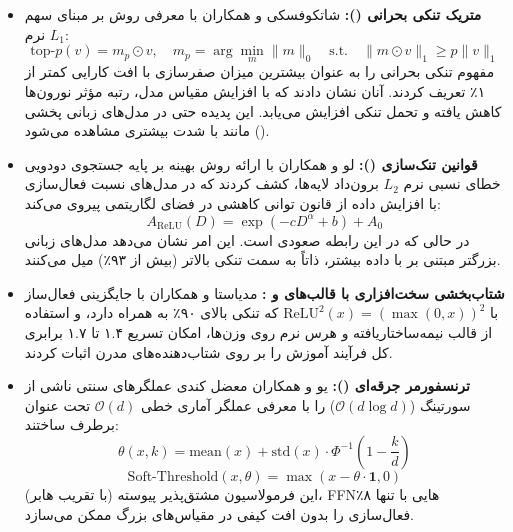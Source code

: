 \begin{itemize}
    \item \textbf{متریک تنکی بحرانی ():} شاتکوفسکی و همکاران \cite{szatkowski2026universal} با معرفی روش  بر مبنای سهم نرم $L_1$:
    \begin{equation}
        \text{top-}p(v) = m_p \odot v, \quad m_p = \arg\min_m \|m\|_0 \quad \text{s.t.} \quad \|m \odot v\|_1 \ge p \|v\|_1
    \end{equation}
    مفهوم تنکی بحرانی را به عنوان بیشترین میزان صفرسازی با افت کارایی کمتر از ۱٪ تعریف کردند. آنان نشان دادند که با افزایش مقیاس مدل، رتبه مؤثر نورون‌ها کاهش یافته و تحمل تنکی افزایش می‌یابد. این پدیده حتی در مدل‌های زبانی پخشی () مانند  با شدت بیشتری مشاهده می‌شود.
    
    \item \textbf{قوانین تنک‌سازی ():} لو و همکاران \cite{luo2024sparsing} با ارائه روش بهینه  بر پایه جستجوی دودویی خطای نسبی نرم $L_2$ برون‌داد لایه‌ها، کشف کردند که در مدل‌های  نسبت فعال‌سازی با افزایش داده از قانون توانی کاهشی در فضای لگاریتمی پیروی می‌کند:
    \begin{equation}
        A_{\text{ReLU}}(D) = \exp(-c D^\alpha + b) + A_0
    \end{equation}
    در حالی که در  این رابطه صعودی است. این امر نشان می‌دهد مدل‌های زبانی بزرگتر مبتنی بر  با داده بیشتر، ذاتاً به سمت تنکی بالاتر (بیش از ۹۳٪) میل می‌کنند.

    \item \textbf{شتاب‌بخشی سخت‌افزاری با قالب‌های  و :} مدیاستا و همکاران \cite{madhyastha2026sparsity} با جایگزینی فعال‌ساز با $\text{ReLU}^2(x) = (\max(0, x))^2$ که تنکی بالای ۹۰٪ به همراه دارد، و استفاده از قالب نیمه‌ساختاریافته  \cite{castro2023venom} و هرس نرم روی وزن‌ها، امکان تسریع ۱.۴ تا ۱.۷ برابری کل فرآیند آموزش را بر روی شتاب‌دهنده‌های مدرن اثبات کردند.
    
    \item \textbf{ترنسفورمر جرقه‌ای ():} یو و همکاران \cite{you2025spark} معضل کندی عملگرهای سنتی  ناشی از سورتینگ ($\mathcal{O}(d \log d)$) را با معرفی عملگر آماری خطی $\mathcal{O}(d)$ تحت عنوان  برطرف ساختند:
    \begin{equation}
        \theta(x, k) = \text{mean}(x) + \text{std}(x) \cdot \Phi^{-1}\left(1 - \frac{k}{d}\right)
    \end{equation}
    \begin{equation}
        \text{Soft-Threshold}(x, \theta) = \max(x - \theta \cdot \mathbf{1}, 0)
    \end{equation}
    این فرمولاسیون مشتق‌پذیر پیوسته (با تقریب هابر)، FFNهایی با تنها ۸٪ فعال‌سازی را بدون افت کیفی در مقیاس‌های بزرگ ممکن می‌سازد.
\end{itemize}

